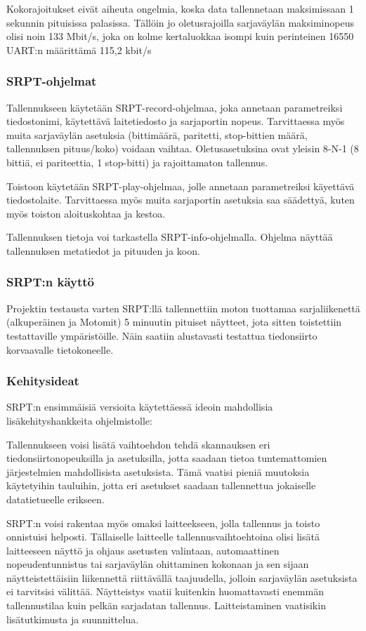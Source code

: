 Kokorajoitukset eivät aiheuta ongelmia, koska data tallennetaan maksimissaan 1 sekunnin pituisissa palasissa. Tällöin jo oletusrajoilla sarjaväylän maksiminopeus olisi noin 133 Mbit/s, joka on kolme kertaluokkaa isompi kuin perinteinen 16550 UART:n määrittämä 115,2 kbit/s \citep{sqlite:limits}

\subsubsection{SRPT-ohjelmat}
Tallennukseen käytetään SRPT-record-ohjelmaa, joka annetaan parametreiksi tiedostonimi, käytettävä laitetiedosto ja sarjaportin nopeus. Tarvittaessa myös muita sarjaväylän asetuksia (bittimäärä, paritetti, stop-bittien määrä, tallennuksen pituus/koko) voidaan vaihtaa. Oletusasetuksina ovat yleisin 8-N-1 (8 bittiä, ei pariteettia, 1 stop-bitti) ja rajoittamaton tallennus.

Toistoon käytetään SRPT-play-ohjelmaa, jolle annetaan parametreiksi käyettävä tiedostolaite. Tarvittaessa myös muita sarjaportin asetuksia saa säädettyä, kuten myös toiston aloituskohtaa ja kestoa.

Tallennuksen tietoja voi tarkastella SRPT-info-ohjelmalla. Ohjelma näyttää tallennuksen metatiedot ja pituuden ja koon.

\subsubsection{SRPT:n käyttö}
Projektin testausta varten SRPT:llä tallennettiin moton tuottamaa sarjaliikenettä (alkuperäinen ja Motomit) 5 minuutin pituiset näytteet, jota sitten toistettiin testattaville ympäristöille. Näin saatiin alustavasti testattua tiedonsiirto korvaavalle tietokoneelle.

\subsubsection{Kehitysideat}
SRPT:n ensimmäisiä versioita käytettäessä ideoin mahdollisia lisäkehityshankkeita ohjelmistolle:

Tallennukseen voisi lisätä vaihtoehdon tehdä skannauksen eri tiedonsiirtonopeuksilla ja asetuksilla, jotta saadaan tietoa tuntemattomien järjestelmien mahdollisista asetuksista. Tämä vaatisi pieniä muutoksia käytetyihin tauluihin, jotta eri asetukset saadaan tallennettua jokaiselle datatietueelle erikseen.

SRPT:n voisi rakentaa myös omaksi laitteekseen, jolla tallennus ja toisto onnistuisi helposti. Tällaiselle laitteelle tallennusvaihtoehtoina olisi lisätä laitteeseen näyttö ja ohjaus asetusten valintaan, automaattinen nopeudentunnistus tai sarjaväylän ohittaminen kokonaan ja sen sijaan näytteistettäisiin liikennettä riittävällä taajuudella, jolloin sarjaväylän asetuksista ei tarvitsisi välittää. Näytteistys vaatii kuitenkin huomattavasti enemmän tallennustilaa kuin pelkän sarjadatan tallennus. Laitteistaminen vaatisikin lisätutkimusta ja suunnittelua.

